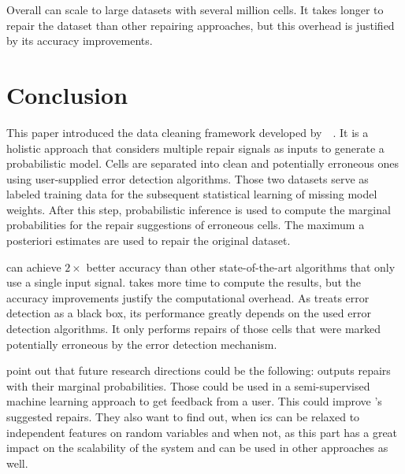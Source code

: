   Overall \holoclean{} can scale to large datasets with several million cells.
  It takes longer to repair the dataset than other repairing approaches, but this overhead is justified by its accuracy improvements.

\section{Conclusion}\label{sec:conclusion}
  This paper introduced the \holoclean{} data cleaning framework developed by~\citeauthor{holoclean}~\cite{holoclean}.
  It is a holistic approach that considers multiple repair signals as inputs to generate a probabilistic model.
  Cells are separated into clean and potentially erroneous ones using user-supplied error detection algorithms.
  Those two datasets serve as labeled training data for the subsequent statistical learning of missing model weights.
  After this step, probabilistic inference is used to compute the marginal probabilities for the repair suggestions of erroneous cells.
  The maximum a posteriori estimates are used to repair the original dataset.

  \holoclean{} can achieve $2 \times$ better accuracy than other state-of-the-art algorithms that only use a single input signal.
  \holoclean{} takes more time to compute the results, but the accuracy improvements justify the computational overhead.
  As \holoclean{} treats error detection as a black box, its performance greatly depends on the used error detection algorithms.
  It only performs repairs of those cells that were marked potentially erroneous by the error detection mechanism.

  \citeauthor{holoclean} point out that future research directions could be the following:
  \holoclean{} outputs repairs with their marginal probabilities.
  Those could be used in a semi-supervised machine learning approach to get feedback from a user.
  This could improve \holoclean{}'s suggested repairs.
  They also want to find out, when \glspl{ic} can be relaxed to independent features on random variables and when not, as this part has a great impact on the scalability of the system and can be used in other approaches as well.
